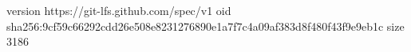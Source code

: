 version https://git-lfs.github.com/spec/v1
oid sha256:9cf59c66292cdd26e508e8231276890e1a7f7c4a09af383d8f480f43f9e9eb1c
size 3186
